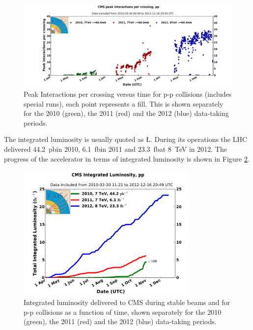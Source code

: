 \begin{figure}
\begin{center}
\includegraphics[angle=-0,width=\textwidth]{2_LHC_and_CMS/pics/peak_pu_pp.pdf}
\caption{Peak Interactions per crossing versus time for p-p collisions (includes special runs), each point represents a fill. This is shown separately for the 2010 (green), the 2011 (red) and the 2012 (blue) data-taking periods.
\label{fig:lhc_pileup}
}
\end{center}
\end{figure}

The integrated luminosity is usually quoted as \L. During its operations the LHC delivered 44.2~pb\Inv in 2010, 6.1~fb\Inv in 2011 and 23.3~fb\Inv at 8~TeV in 2012. The progress of the accelerator in terms of integrated luminosity is shown in Figure \ref{fig:int_lumi}.

\begin{figure}
\begin{center}
\includegraphics[angle=-0,width=0.8\textwidth]{2_LHC_and_CMS/pics/int_lumi.pdf}
\caption{Integrated luminosity delivered to CMS during stable beams and for p-p collisions as a function of time, shown separately for the 2010 (green), the 2011 (red) and the 2012 (blue) data-taking periods.
\label{fig:int_lumi}
}
\end{center}
\end{figure}


